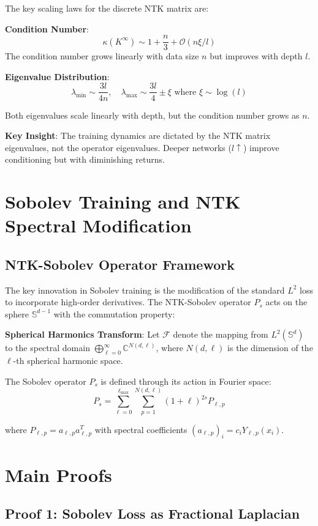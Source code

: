 \documentclass{article}
\begin{document}
The key scaling laws for the discrete NTK matrix are:

\textbf{Condition Number}:
\[ \kappa(K^{\infty}) \sim 1 + \frac{n}{3} + \mathcal{O}(n \xi / l) \]
The condition number grows linearly with data size $n$ but improves with depth $l$.

\textbf{Eigenvalue Distribution}:
\[ \lambda_{\text{min}} \sim \frac{3l}{4n}, \quad \lambda_{\text{max}} \sim \frac{3l}{4} \pm \xi \text{ where } \xi \sim \log(l) \]

Both eigenvalues scale linearly with depth, but the condition number grows as $n$.

\textbf{Key Insight}: The training dynamics are dictated by the NTK matrix eigenvalues, not the operator eigenvalues. Deeper networks ($l \uparrow$) improve conditioning but with diminishing returns.

\section{Sobolev Training and NTK Spectral Modification}

\subsection{NTK-Sobolev Operator Framework}

The key innovation in Sobolev training is the modification of the standard $L^2$ loss to incorporate high-order derivatives. The NTK-Sobolev operator $P_s$ acts on the sphere $\mathbb{S}^{d-1}$ with the commutation property:

\textbf{Spherical Harmonics Transform}: Let $\mathcal{F}$ denote the mapping from $L^2(\mathbb{S}^d)$ to the spectral domain $\bigoplus_{\ell=0}^{\infty} \mathbb{C}^{N(d,\ell)}$, where $N(d,\ell)$ is the dimension of the $\ell$-th spherical harmonic space.

The Sobolev operator $P_s$ is defined through its action in Fourier space:
\[ P_s = \sum_{\ell=0}^{\ell_{\max}} \sum_{p=1}^{N(d,\ell)} (1+\ell)^{2s}P_{\ell,p} \]

where $P_{\ell,p} = a_{\ell,p}a_{\ell,p}^T$ with spectral coefficients $(a_{\ell,p})_i = c_iY_{\ell,p}(x_i)$.
\section{Main Proofs}

\subsection{Proof 1: Sobolev Loss as Fractional Laplacian}
\end{document}

